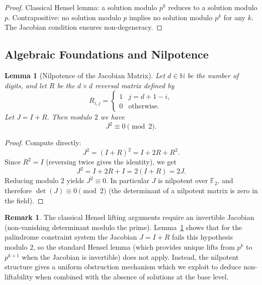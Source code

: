 \documentclass[11pt,a4paper]{article}
\theoremstyle{plain}
\newtheorem{lemma}[theorem]{Lemma}
\theoremstyle{definition}
\newtheorem{remark}[theorem]{Remark}
\newcommand{\F}{\mathbb{F}}
\begin{document}
\begin{proof}
Classical Hensel lemma: a solution modulo $p^k$ reduces to a solution modulo $p$. Contrapositive: no solution modulo $p$ implies no solution modulo $p^k$ for any $k$. The Jacobian condition ensures non-degeneracy.
\end{proof}

\subsection{Algebraic Foundations and Nilpotence}

\begin{lemma}[Nilpotence of the Jacobian Matrix]\label{lem:nilpotence_J}
Let $d \in \mathbb{N}$ be the number of digits, and let $R$ be the $d \times d$ reversal matrix defined by
\[ R_{i,j} = \begin{cases}1 & j = d + 1 - i, \\ 0 & \text{otherwise.}\end{cases}\]
Let $J = I + R$. Then modulo $2$ we have
\[ J^2 \equiv 0 \pmod{2}. \]
\end{lemma}

\begin{proof}
Compute directly:
\[
J^2 = (I + R)^2 = I + 2R + R^2.
\]
Since $R^2 = I$ (reversing twice gives the identity), we get
\[
J^2 = I + 2R + I = 2(I + R) = 2J.
\]
Reducing modulo $2$ yields $J^2 \equiv 0$. In particular $J$ is nilpotent over $\F_2$, and therefore $\det(J) \equiv 0 \pmod{2}$ (the determinant of a nilpotent matrix is zero in the field).
\end{proof}

\begin{remark}
The classical Hensel lifting arguments require an invertible Jacobian (non-vanishing determinant modulo the prime). Lemma~\ref{lem:nilpotence_J} shows that for the palindrome constraint system the Jacobian $J=I+R$ fails this hypothesis modulo $2$, so the standard Hensel lemma (which provides unique lifts from $p^k$ to $p^{k+1}$ when the Jacobian is invertible) does not apply. Instead, the nilpotent structure gives a uniform obstruction mechanism which we exploit to deduce non-liftability when combined with the absence of solutions at the base level.
\end{remark}
\end{document}
